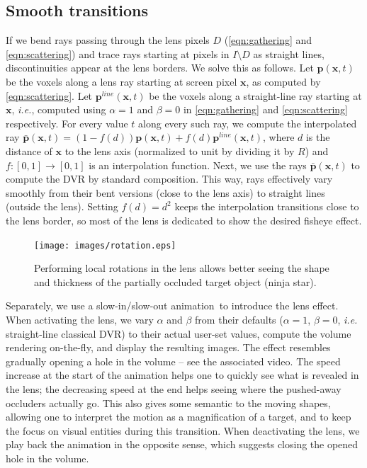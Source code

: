 \subsection{Smooth transitions}
\label{continuity} 
%
If we bend rays passing through the lens pixels $D$ (\autoref{eqn:gathering} and \autoref{eqn:scattering}) and trace rays starting at pixels in $I \setminus D$ as straight lines, discontinuities appear at the lens borders. We solve this as follows. Let $\mathbf{p}(\mathbf{x},t)$ be the voxels along a lens ray starting at screen pixel $\mathbf{x}$, as computed by  \autoref{eqn:scattering}. Let $\mathbf{p}^{line}(\mathbf{x},t)$ be the voxels along a straight-line ray starting at $\mathbf{x}$, \emph{i.e.}, computed using $\alpha=1$ and $\beta=0$ in  \autoref{eqn:gathering} and \autoref{eqn:scattering} respectively. For every value $t$ along every such ray, we compute the interpolated ray $\bar{\mathbf{p}}(\mathbf{x},t) = (1-f(d))\mathbf{p}(\mathbf{x},t) + f(d)\mathbf{p}^{line}(\mathbf{x},t)$, where $d$ is the distance of $\mathbf{x}$ to the lens axis (normalized to unit by dividing it by $R$) and $f : [0,1] \rightarrow [0,1]$ is an interpolation function. Next, we use the rays $\bar{\mathbf{p}}(\mathbf{x},t)$ to compute the DVR by standard composition. This way, rays effectively vary smoothly from their bent versions (close to the lens axis) to straight lines (outside the lens). Setting $f(d) = d^2$ keeps the interpolation transitions close to the lens border, so most of the lens is dedicated to show the desired fisheye effect.

\begin{figure}
\centering
\texttt{[image: images/rotation.eps]}

\caption{Performing local rotations in the lens allows better seeing the shape and thickness of the partially occluded target object (ninja star).}
\label{f:rotation}

\end{figure}

Separately, we use a slow-in/slow-out animation\,\cite{Dragicevic:2011:TDA:1978942.1979233} to introduce the lens effect. When activating the lens, we vary $\alpha$ and $\beta$ from their defaults ($\alpha=1$, $\beta=0$, \emph{i.e.} straight-line classical DVR) to their actual user-set values, compute the volume rendering on-the-fly, and display the resulting images. The effect resembles gradually opening a hole in the volume -- see the associated video. The speed increase at the start of the animation helps one to quickly see what is revealed in the lens; the decreasing speed at the end helps seeing where the pushed-away occluders actually go. This also gives some semantic to the moving shapes, allowing one to interpret the motion as a magnification of a target, and to keep the focus on visual entities during this transition. When deactivating the lens, we play back the animation in the opposite sense, which suggests closing the opened hole in the volume.

